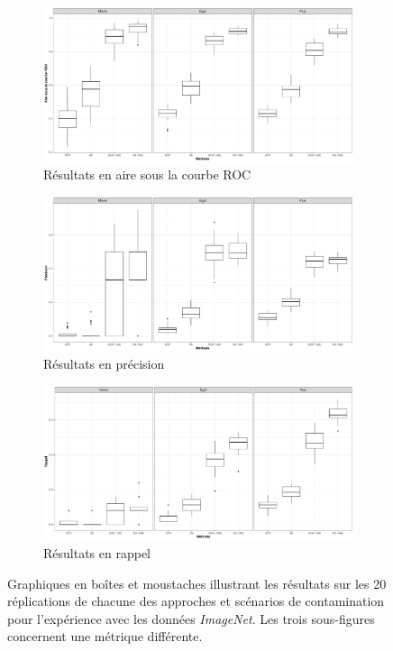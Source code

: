 \begin{figure}[h!]
	\centering
	\begin{subfigure}{12cm}
		\includegraphics[width=12cm]{images/images_boxplots/auc_cars.pdf}
		\caption{Résultats en aire sous la courbe ROC}
	\end{subfigure}
	\begin{subfigure}{12cm}
		\includegraphics[width=12cm]{images/images_boxplots/precision_cars.pdf}
		\caption{Résultats en précision}
	\end{subfigure}
	\begin{subfigure}{12cm}
		\includegraphics[width=12cm]{images/images_boxplots/recall_cars.pdf}
		\caption{Résultats en rappel}
	\end{subfigure}
	\caption[Graphiques en boîtes et moustaches illustrant les résultats sur \textit{ImageNet}.]{Graphiques en boîtes et moustaches illustrant les résultats sur les 20 réplications de chacune des approches et scénarios de contamination pour l'expérience avec les données \textit{ImageNet}. Les trois sous-figures concernent une métrique différente.}
	\label{fig:auc_cars}
\end{figure}

